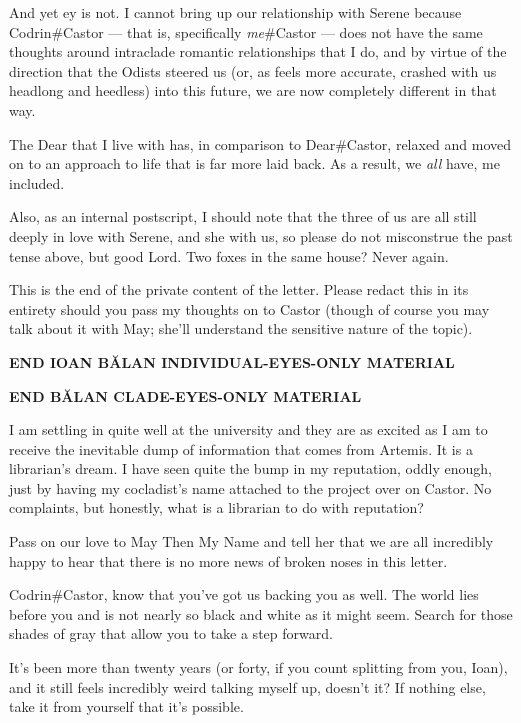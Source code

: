 And yet ey is not. I cannot bring up our relationship with Serene because Codrin\#Castor — that is, specifically \emph{me}\#Castor — does not have the same thoughts around intraclade romantic relationships that I do, and by virtue of the direction that the Odists steered us (or, as feels more accurate, crashed with us headlong and heedless) into this future, we are now completely different in that way.

The Dear that I live with has, in comparison to Dear\#Castor, relaxed and moved on to an approach to life that is far more laid back. As a result, we \emph{all} have, me included.

Also, as an internal postscript, I should note that the three of us are all still deeply in love with Serene, and she with us, so please do not misconstrue the past tense above, but good Lord. Two foxes in the same house? Never again.

This is the end of the private content of the letter. Please redact this in its entirety should you pass my thoughts on to Castor (though of course you may talk about it with May; she'll understand the sensitive nature of the topic).

\begin{center}
\textbf{END IOAN BĂLAN INDIVIDUAL-EYES-ONLY MATERIAL}
\end{center}

\begin{center}
\textbf{END BĂLAN CLADE-EYES-ONLY MATERIAL}
\end{center}

I am settling in quite well at the university and they are as excited as I am to receive the inevitable dump of information that comes from Artemis. It is a librarian's dream. I have seen quite the bump in my reputation, oddly enough, just by having my cocladist's name attached to the project over on Castor. No complaints, but honestly, what is a librarian to do with reputation?

Pass on our love to May Then My Name and tell her that we are all incredibly happy to hear that there is no more news of broken noses in this letter.

Codrin\#Castor, know that you've got us backing you as well. The world lies before you and is not nearly so black and white as it might seem. Search for those shades of gray that allow you to take a step forward.

It's been more than twenty years (or forty, if you count splitting from you, Ioan), and it still feels incredibly weird talking myself up, doesn't it? If nothing else, take it from yourself that it's possible.

